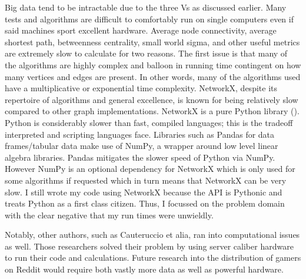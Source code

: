 \documentclass[12pt, a4paper]{article}
\begin{document}
Big data tend to be intractable due to the three Vs as discussed earlier. Many tests and algorithms are difficult to comfortably run on single computers even if said machines sport excellent hardware. Average node connectivity, average shortest path, betweenness centrality, small world sigma, and other useful metrics are extremely slow to calculate for two reasons. The first issue is that many of the algorithms are highly complex and balloon in running time contingent on how many vertices and edges are present. In other words, many of the algorithms used have a multiplicative or exponential time complexity. NetworkX, despite its repertoire of algorithms and general excellence, is known for being relatively slow compared to other graph implementations. NetworkX is a pure Python library (\cite{networkx}). Python is considerably slower than fast, compiled languages; this is the tradeoff interpreted and scripting languages face. Libraries such as Pandas for data frames/tabular data make use of NumPy, a wrapper around low level linear algebra libraries. Pandas mitigates the slower speed of Python via NumPy. However NumPy is an optional dependency for NetworkX which is only used for some algorithms if requested which in turn means that NetworkX can be very slow. I still wrote my code using NetworkX because the API is Pythonic and treats Python as a first class citizen. Thus, I focussed on the problem domain with the clear negative that my run times were unwieldly.

Notably, other authors, such as Cauteruccio et alia, ran into computational issues as well. Those researchers solved their problem by using server caliber hardware to run their code and calculations. Future research into the distribution of gamers on Reddit would require both vastly more data as well as powerful hardware.

\printbibliography
\end{document}
